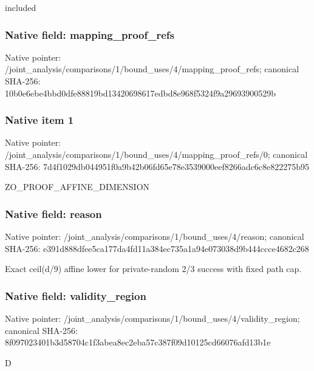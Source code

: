 \documentclass[10pt,a4paper]{article}
\begin{document}
\begingroup\raggedright\sloppy included\par\endgroup

\subsubsection{Native field: mapping\_\allowbreak{}proof\_\allowbreak{}refs}
Native pointer: /joint\_\allowbreak{}analysis/comparisons/1/bound\_\allowbreak{}uses/4/mapping\_\allowbreak{}proof\_\allowbreak{}refs; canonical SHA-256: 10b0e6ebe4bbd0dfe88819bd13420698617edbd8e968f5324f9a29693900529b

\subsubsection{Native item 1}
Native pointer: /joint\_\allowbreak{}analysis/comparisons/1/bound\_\allowbreak{}uses/4/mapping\_\allowbreak{}proof\_\allowbreak{}refs/0; canonical SHA-256: 7d4f1029db044951f0a9b42b06fd65e78e3539000eef8266adc6c8e822275b95

\begingroup\raggedright\sloppy ZO\_\allowbreak{}PROOF\_\allowbreak{}AFFINE\_\allowbreak{}DIMENSION\par\endgroup

\subsubsection{Native field: reason}
Native pointer: /joint\_\allowbreak{}analysis/comparisons/1/bound\_\allowbreak{}uses/4/reason; canonical SHA-256: e391d888dfee5ca177da4fd11a384ec735a1a94e073038d9b444ccce4682c268

\begingroup\raggedright\sloppy Exact ceil(d/\allowbreak{}9) affine lower for private-random 2/\allowbreak{}3 success with fixed path cap.\par\endgroup

\subsubsection{Native field: validity\_\allowbreak{}region}
Native pointer: /joint\_\allowbreak{}analysis/comparisons/1/bound\_\allowbreak{}uses/4/validity\_\allowbreak{}region; canonical SHA-256: 8f097023401b3d58704c1f3abea8ec2eba57c387f09d10125cd66076afd13b1e

\begingroup\raggedright\sloppy D\par\endgroup
\end{document}
